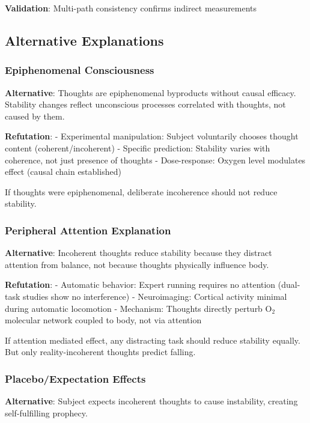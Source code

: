 \documentclass[11pt,onecolumn]{article}
\begin{document}
\textbf{Validation}: Multi-path consistency confirms indirect measurements

\subsection{Alternative Explanations}

\subsubsection{Epiphenomenal Consciousness}

\textbf{Alternative}: Thoughts are epiphenomenal byproducts without causal efficacy. Stability changes reflect unconscious processes correlated with thoughts, not caused by them.

\textbf{Refutation}:
- Experimental manipulation: Subject voluntarily chooses thought content (coherent/incoherent)
- Specific prediction: Stability varies with coherence, not just presence of thoughts
- Dose-response: Oxygen level modulates effect (causal chain established)

If thoughts were epiphenomenal, deliberate incoherence should not reduce stability.

\subsubsection{Peripheral Attention Explanation}

\textbf{Alternative}: Incoherent thoughts reduce stability because they distract attention from balance, not because thoughts physically influence body.

\textbf{Refutation}:
- Automatic behavior: Expert running requires no attention (dual-task studies show no interference)
- Neuroimaging: Cortical activity minimal during automatic locomotion
- Mechanism: Thoughts directly perturb O$_2$ molecular network coupled to body, not via attention

If attention mediated effect, any distracting task should reduce stability equally. But only reality-incoherent thoughts predict falling.

\subsubsection{Placebo/Expectation Effects}

\textbf{Alternative}: Subject expects incoherent thoughts to cause instability, creating self-fulfilling prophecy.
\end{document}
